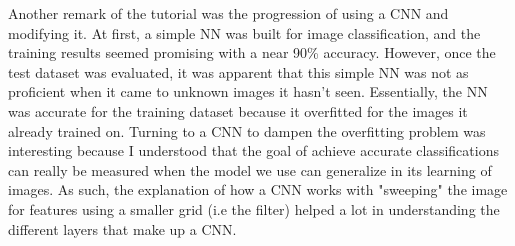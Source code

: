 \documentclass[10pt,twocolumn]{article}
\begin{document}
Another remark of the tutorial was the progression of using a CNN and modifying it. At first, a simple NN was built for image classification, and the training results seemed promising with a near 90\% accuracy. However, once the test dataset was evaluated, it was apparent that this simple NN was not as proficient when it came to unknown images it hasn't seen. Essentially, the NN was accurate for the training dataset because it overfitted for the images it already trained on. Turning to a CNN to dampen the overfitting problem was interesting because I understood that the goal of achieve accurate classifications can really be measured when the model we use can generalize in its learning of images. As such, the explanation of how a CNN works with "sweeping" the image for features using a smaller grid (i.e the filter) helped a lot in understanding the different layers that make up a CNN.
\end{document}

